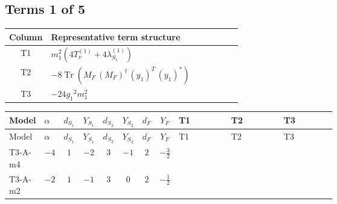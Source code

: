 \documentclass[8pt]{article}
\begin{document}
\begin{landscape}
\subsection*{Terms 1 of 5}
\begin{center}
\begin{tabular}{@{}c >{\raggedright\arraybackslash}p{0.82\linewidth}@{}}
\toprule
Column & Representative term structure \\
\midrule
T1 & \(\displaystyle {m_1^2} (4 T_{\nu}^{(1)}+4 {\lambda_{S_1}^{(1)}})\) \\
\midrule
T2 & \(\displaystyle -8 \operatorname{Tr}\!\left({M_F}\,\left({M_F}\right)^{\dagger}\,\left({y_1}\right)^{T}\,\left({y_1}\right)^{*}\right)\) \\
\midrule
T3 & \(\displaystyle -24 {g_1}^2 {m_1^2}\) \\
\midrule
\bottomrule
\end{tabular}
\end{center}
\smallskip
\tiny
\begin{longtable}{@{}llcccccc >{\raggedright\arraybackslash}p{0.21\linewidth} >{\raggedright\arraybackslash}p{0.21\linewidth} >{\raggedright\arraybackslash}p{0.21\linewidth}@{}}
\toprule
Model & $\alpha$ & $d_{S_1}$ & $Y_{S_1}$ & $d_{S_2}$ & $Y_{S_2}$ & $d_F$ & $Y_F$ & T1 & T2 & T3 \\
\midrule
\endfirsthead
\toprule
Model & $\alpha$ & $d_{S_1}$ & $Y_{S_1}$ & $d_{S_2}$ & $Y_{S_2}$ & $d_F$ & $Y_F$ & T1 & T2 & T3 \\
\midrule
\endhead
T3-A-m4 & $-4$ & $1$ & $-2$ & $3$ & $-1$ & $2$ & $-\frac{3}{2}$ & \scriptsize\adjustbox{max width=\linewidth}{$\begin{gathered} {m_1^2} (4 T_{\nu}^{(1)}+4 {\lambda_{S_1}^{(1)}})\end{gathered}$} & \scriptsize\adjustbox{max width=\linewidth}{$\begin{gathered} -8 \operatorname{Tr}\!\left({M_F}\,\left({M_F}\right)^{\dagger}\,\left({y_1}\right)^{T}\,\left({y_1}\right)^{*}\right)\end{gathered}$} & \scriptsize\adjustbox{max width=\linewidth}{$\begin{gathered} -24 {g_1}^2 {m_1^2}\end{gathered}$} \\
\midrule
T3-A-m2 & $-2$ & $1$ & $-1$ & $3$ & $0$ & $2$ & $-\frac{1}{2}$ & \scriptsize\adjustbox{max width=\linewidth}{$\begin{gathered} {m_1^2} (4 T_{\nu}^{(1)}+4 {\lambda_{S_1}^{(1)}})\end{gathered}$} & \scriptsize\adjustbox{max width=\linewidth}{$\begin{gathered} -8 \operatorname{Tr}\!\left({M_F}\,\left({M_F}\right)^{\dagger}\,\left({y_1}\right)^{T}\,\left({y_1}\right)^{*}\right)\end{gathered}$} & \scriptsize\adjustbox{max width=\linewidth}{$\begin{gathered} -6 {g_1}^2 {m_1^2}\end{gathered}$} \\

\end{longtable}
\end{landscape}
\end{document}
